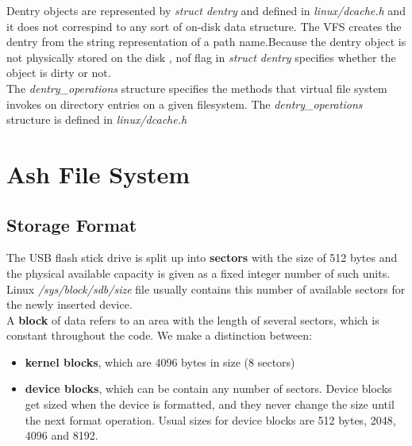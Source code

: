 \documentclass[conference]{IEEEtran}
\begin{document}
Dentry objects are represented by {\em struct dentry} and defined in {\em linux/dcache.h} and it does not 
correspind to any sort of on-disk data structure. The VFS creates the dentry from the string representation of 
a path name.Because the dentry object is not physically stored on the disk , nof flag in {\em struct dentry}
specifies whether the object is dirty or not. \\

The {\em dentry\_operations}  structure specifies the methods that virtual file system invokes on directory entries on a 
given filesystem. The {\em dentry\_operations} structure is defined in {\em linux/dcache.h} 


\section{Ash File System}

\subsection{Storage Format}
The USB flash stick drive is split up into {\bf sectors} with the size of 512 bytes and the physical available
capacity is given as a fixed integer number of such units. Linux {\em /sys/block/sdb/size} file usually contains 
this number of available sectors for the newly inserted device.\\

A {\bf block} of data refers to an area with the length of
several sectors, which is constant throughout the code. We make a distinction between:
\begin{itemize}
\item
{\bf kernel blocks}, which are 4096 bytes in size (8 sectors)
\item
{\bf device blocks}, which can be contain any number of sectors. Device blocks get sized when the device is formatted, and
they never change the size until the next format operation. Usual sizes for device blocks are 512 bytes, 2048, 4096 and 8192.
\end{itemize}
\end{document}

